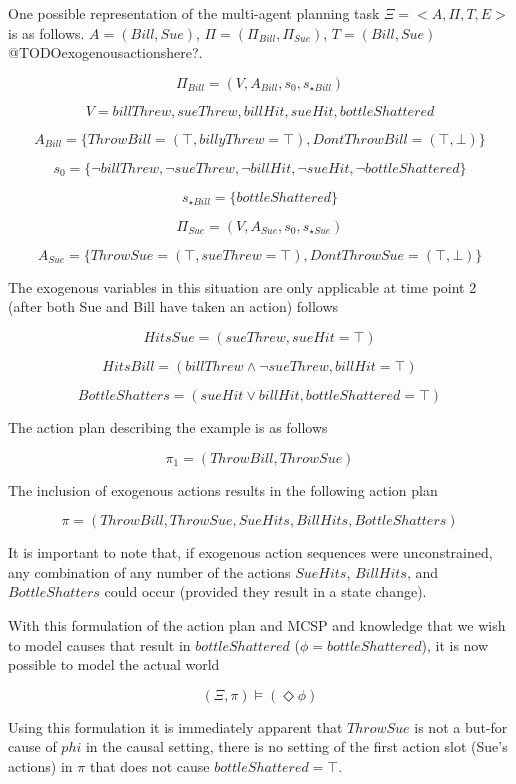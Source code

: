 \documentclass{article}
\theoremstyle{plain}
\theoremstyle{definition}
\begin{document}
One possible representation of the multi-agent planning task $\Xi=<A, \Pi, T, E>$ is as follows. $A=(Bill, Sue)$, $\Pi=(\Pi_{Bill},\Pi_{Sue})$, $T= (Bill, Sue)$ @TODOexogenousactionshere?.

\[
\Pi_{Bill}=(V, A_{Bill}, s_0, s_{\star Bill})
\]

\[
V = {billThrew, sueThrew, billHit, sueHit, bottleShattered}
\]

\[
A_{Bill}=\{ThrowBill = (\top, billyThrew = \top), {DontThrowBill=(\top, \bot)} \}
\]

\[
s_0 = \{\lnot billThrew, \lnot sueThrew, \lnot billHit, \lnot sueHit, \lnot bottleShattered \}
\]

\[ s_{\star Bill} = \{bottleShattered\} \]

\[
\Pi_{Sue}=(V, A_{Sue}, s_0, s_{\star Sue})
\]

\[
A_{Sue}=\{ThrowSue = (\top, sueThrew = \top), {DontThrowSue=(\top, \bot)} \}
\]

The exogenous variables in this situation are only applicable at time point 2 (after both Sue and Bill have taken an action) follows

\[
HitsSue = (sueThrew, sueHit = \top)
\]

\[
HitsBill = (billThrew \land \lnot sueThrew, billHit = \top)
\]

\[
BottleShatters = (sueHit \lor billHit, bottleShattered = \top)
\]

The action plan describing the example is as follows

\[
\pi_1=(ThrowBill, ThrowSue)
\]

The inclusion of exogenous actions results in the following action plan

\[
\pi = (ThrowBill, ThrowSue, SueHits, BillHits, BottleShatters)
\]

It is important to note that, if exogenous action sequences were unconstrained, any combination of any number of the actions $SueHits$, $BillHits$, and $BottleShatters$ could occur (provided they result in a state change).

With this formulation of the action plan and MCSP and knowledge that we wish to model causes that result in $bottleShattered$ ($\phi=bottleShattered$), it is now possible to model the actual world 

\[
(\Xi, \pi) \models (\Diamond \phi)
\]

Using this formulation it is immediately apparent that $ThrowSue$ is not a but-for cause of $phi$ in the causal setting, there is no setting of the first action slot (Sue's actions) in $\pi$ that does not cause $bottleShattered=\top$.
\end{document}
